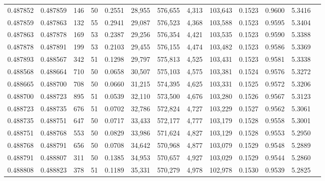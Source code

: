 \begin{tabular}{rrrrrrrrrrrrr}
0.487852 & 0.487859 & 146 &  50 &                                     0.2551 &  28,955 & 576,655 &   4,313 & 103,643 & 0.1523 & 0.9600 & 5.3416 \\
0.487859 & 0.487863 & 132 &  55 &                                     0.2941 &  29,087 & 576,523 &   4,368 & 103,588 & 0.1523 & 0.9595 & 5.3404 \\
0.487863 & 0.487878 & 169 &  53 &                                     0.2387 &  29,256 & 576,354 &   4,421 & 103,535 & 0.1523 & 0.9590 & 5.3388 \\
0.487878 & 0.487891 & 199 &  53 &                                     0.2103 &  29,455 & 576,155 &   4,474 & 103,482 & 0.1523 & 0.9586 & 5.3369 \\
0.487893 & 0.488567 & 342 &  51 &                                     0.1298 &  29,797 & 575,813 &   4,525 & 103,431 & 0.1523 & 0.9581 & 5.3338 \\
0.488568 & 0.488664 & 710 &  50 &                                     0.0658 &  30,507 & 575,103 &   4,575 & 103,381 & 0.1524 & 0.9576 & 5.3272 \\
0.488665 & 0.488700 & 708 &  50 &                                     0.0660 &  31,215 & 574,395 &   4,625 & 103,331 & 0.1525 & 0.9572 & 5.3206 \\
0.488700 & 0.488723 & 895 &  51 &                                     0.0539 &  32,110 & 573,500 &   4,676 & 103,280 & 0.1526 & 0.9567 & 5.3123 \\
0.488723 & 0.488735 & 676 &  51 &                                     0.0702 &  32,786 & 572,824 &   4,727 & 103,229 & 0.1527 & 0.9562 & 5.3061 \\
0.488735 & 0.488751 & 647 &  50 &                                     0.0717 &  33,433 & 572,177 &   4,777 & 103,179 & 0.1528 & 0.9558 & 5.3001 \\
0.488751 & 0.488768 & 553 &  50 &                                     0.0829 &  33,986 & 571,624 &   4,827 & 103,129 & 0.1528 & 0.9553 & 5.2950 \\
0.488768 & 0.488791 & 656 &  50 &                                     0.0708 &  34,642 & 570,968 &   4,877 & 103,079 & 0.1529 & 0.9548 & 5.2889 \\
0.488791 & 0.488807 & 311 &  50 &                                     0.1385 &  34,953 & 570,657 &   4,927 & 103,029 & 0.1529 & 0.9544 & 5.2860 \\
0.488808 & 0.488823 & 378 &  51 &                                     0.1189 &  35,331 & 570,279 &   4,978 & 102,978 & 0.1530 & 0.9539 & 5.2825 \\

\end{tabular}

